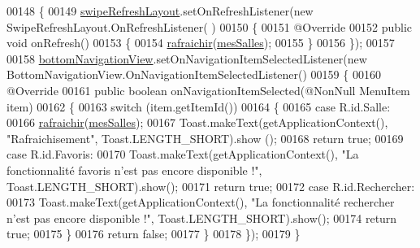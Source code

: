 \begin{DoxyCode}
00148     \{
00149         \hyperlink{classcom_1_1lasalle_1_1meeting_1_1_main_activity_a8feba36a47aa90a06a1df709d24799ec}{swipeRefreshLayout}.setOnRefreshListener(\textcolor{keyword}{new} SwipeRefreshLayout.OnRefreshListener(
      )
00150         \{
00151             @Override
00152             \textcolor{keyword}{public} \textcolor{keywordtype}{void} onRefresh()
00153             \{
00154                 \hyperlink{classcom_1_1lasalle_1_1meeting_1_1_main_activity_a58c77ea2af56877f661e85dcfd3f1299}{rafraichir}(\hyperlink{classcom_1_1lasalle_1_1meeting_1_1_main_activity_ab13e34516d877abc3ba937505b441979}{mesSalles});
00155             \}
00156         \});
00157 
00158         \hyperlink{classcom_1_1lasalle_1_1meeting_1_1_main_activity_abc43c4bd4402dd5b7066773a2276244b}{bottomNavigationView}.setOnNavigationItemSelectedListener(\textcolor{keyword}{new} 
      BottomNavigationView.OnNavigationItemSelectedListener()
00159         \{
00160             @Override
00161             \textcolor{keyword}{public} \textcolor{keywordtype}{boolean} onNavigationItemSelected(@NonNull MenuItem item)
00162             \{
00163                 \textcolor{keywordflow}{switch} (item.getItemId())
00164                 \{
00165                     \textcolor{keywordflow}{case} R.id.Salle:
00166                         \hyperlink{classcom_1_1lasalle_1_1meeting_1_1_main_activity_a58c77ea2af56877f661e85dcfd3f1299}{rafraichir}(\hyperlink{classcom_1_1lasalle_1_1meeting_1_1_main_activity_ab13e34516d877abc3ba937505b441979}{mesSalles});
00167                         Toast.makeText(getApplicationContext(), \textcolor{stringliteral}{"Rafraichisement"}, Toast.LENGTH\_SHORT).show
      ();
00168                         \textcolor{keywordflow}{return} \textcolor{keyword}{true};
00169                     \textcolor{keywordflow}{case} R.id.Favoris:
00170                         Toast.makeText(getApplicationContext(), \textcolor{stringliteral}{"La fonctionnalité favoris n'est pas encore
       disponible !"}, Toast.LENGTH\_SHORT).show();
00171                         \textcolor{keywordflow}{return} \textcolor{keyword}{true};
00172                     \textcolor{keywordflow}{case} R.id.Rechercher:
00173                         Toast.makeText(getApplicationContext(), \textcolor{stringliteral}{"La fonctionnalité rechercher n'est pas
       encore disponible !"}, Toast.LENGTH\_SHORT).show();
00174                         \textcolor{keywordflow}{return} \textcolor{keyword}{true};
00175                 \}
00176                 \textcolor{keywordflow}{return} \textcolor{keyword}{false};
00177             \}
00178         \});
00179     \}
\end{DoxyCode}
\mbox{\label{classcom_1_1lasalle_1_1meeting_1_1_main_activity_a1502e68ede2683ced61843887ca63963}} 
